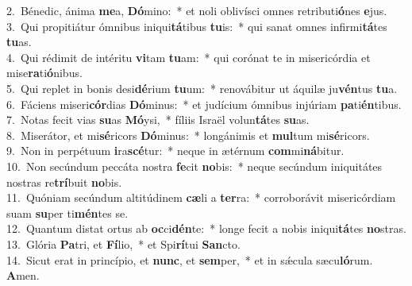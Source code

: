 {2.~}Bénedic, ánima \textbf{me}a, \textbf{Dó}mino:~* et noli oblivísci omnes retributi\textbf{ó}nes \textbf{e}jus.\\
{3.~}Qui propitiátur ómnibus iniqui\textbf{tá}tibus \textbf{tu}is:~* qui sanat omnes infirmi\textbf{tá}tes \textbf{tu}as.\\
{4.~}Qui rédimit de intéritu \textbf{vi}tam \textbf{tu}am:~* qui corónat te in misericórdia et mise\textbf{ra}ti\textbf{ó}nibus.\\
{5.~}Qui replet in bonis desi\textbf{dé}rium \textbf{tu}um:~* renovábitur ut áquilæ ju\textbf{vén}tus \textbf{tu}a.\\
{6.~}Fáciens miseri\textbf{cór}dias \textbf{Dó}minus:~* et judícium ómnibus injúriam \textbf{pa}ti\textbf{én}tibus.\\
{7.~}Notas fecit vias \textbf{su}as \textbf{Mó}ysi,~* fíliis Israël volun\textbf{tá}tes \textbf{su}as.\\
{8.~}Miserátor, et mi\textbf{sé}ricors \textbf{Dó}minus:~* longánimis et \textbf{mul}tum mi\textbf{sé}ricors.\\
{9.~}Non in perpétuum \textbf{i}ra\textbf{scé}tur:~* neque in ætérnum \textbf{com}mi\textbf{ná}bitur.\\
{10.~}Non secúndum peccáta nostra \textbf{fe}cit \textbf{no}bis:~* neque secúndum iniquitátes nostras re\textbf{trí}buit \textbf{no}bis.\\
{11.~}Quóniam secúndum altitúdinem \textbf{cæ}li a \textbf{ter}ra:~* corroborávit misericórdiam suam \textbf{su}per ti\textbf{mén}tes se.\\
{12.~}Quantum distat ortus ab \textbf{oc}ci\textbf{dén}te:~* longe fecit a nobis iniqui\textbf{tá}tes \textbf{no}stras.\\
{13.~}Glória \textbf{Pa}tri, et \textbf{Fí}lio,~* et Spi\textbf{rí}tui \textbf{San}cto.\\
{14.~}Sicut erat in princípio, et \textbf{nunc}, et \textbf{sem}per,~* et in sǽcula sæcu\textbf{ló}rum. \textbf{A}men.\\
